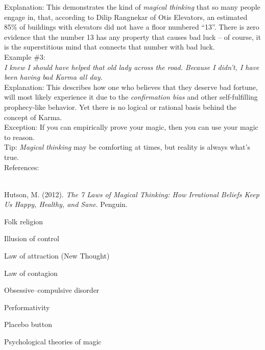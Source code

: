 \documentclass[a4paper,12pt,single,pdftex]{scrartcl}
\begin{document}
{    
      Explanation: This demonstrates the kind of {\it magical thinking}  that so many people engage in, that, according to Dilip Rangnekar of Otis Elevators, an estimated 85\% of buildings with elevators did not have a floor numbered “13”.  There is zero evidence that the number 13 has any property that causes bad luck -- of course, it is the superstitious mind that connects that number with bad luck.
    \\

    
      Example \#3:
    \\

    
      {\em I knew I should have helped that old lady across the road.  Because I didn’t, I have been having bad Karma all day.}
    \\

    
      Explanation: This describes how one who believes that they deserve bad fortune, will most likely experience it due to the {\it confirmation bias} and other self-fulfilling prophecy-like behavior.  Yet there is no logical or rational basis behind the concept of Karma.
    \\

    
      Exception: If you can empirically prove your magic, then you can use your magic to reason.
    \\

    
      Tip: {\it Magical thinking} may be comforting at times, but reality is always what’s true.
    \\

    References:

    
      
        
      \\

      
        
          Hutson, M. (2012). {\it The 7 Laws of Magical Thinking: How Irrational Beliefs Keep Us Happy, Healthy, and Sane}. Penguin.
        
      
    
  }


Folk religion

Illusion of control

Law of attraction (New Thought)

Law of contagion

Obsessive–compulsive disorder

Performativity

Placebo button

Psychological theories of magic
\end{document}
